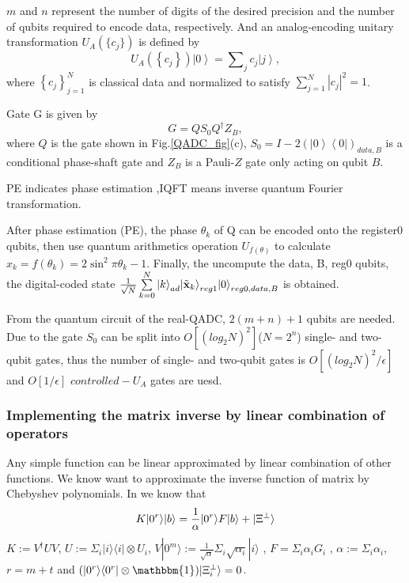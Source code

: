 \documentclass[%
 reprint,
 amsmath,amssymb,
pra,
]{revtex4-1}
\begin{document}
$m$ and $n$ represent the number of digits of the desired precision and the number of qubits required to encode data, respectively.
And an analog-encoding unitary transformation $U_A(\{c_j\})$ is defined by
\begin{equation}
U_A\left( {\left\{ {{c_j}} \right\}} \right)\left| 0 \right\rangle  = \sum\nolimits_j {{c_j}\left| j \right\rangle },
\end{equation}
where $\left\{ {{c_j}} \right\}_{j = 1}^N$ is classical data and normalized to satisfy $\sum\nolimits_{j = 1}^N {{{\left| {{c_j}} \right|}^2}}  = 1$.

Gate G is given by
\begin{equation}
G = Q{S_0}{Q^\dag }{Z_B},
\end{equation}
where $Q$ is the gate shown in Fig.\ref{QADC_fig}(c), ${S_0} = I - 2{\left( {\left| 0 \right\rangle \left\langle 0 \right|} \right)_{data,B}}$
is a conditional phase-shaft gate and ${Z_B}$ is a Pauli-$Z$ gate only acting on qubit $B$.

PE indicates phase estimation ,IQFT means inverse quantum Fourier transformation\cite{nielsen_quantum_2002}.

After phase estimation (PE), the phase ${\theta _k}$ of Q can be encoded onto the register0 qubits, then use quantum arithmetics operation ${U_{f\left( \theta  \right)}}$ to calculate
${x_k} = f\left( {{\theta _k}} \right) = 2{\sin ^2}\pi {\theta _k} - 1$.
Finally, the uncompute the data, B, reg0 qubits, the digital-coded state
$\frac{1}{{\sqrt N }}\sum\limits_{k = 0}^N {{{\left| k \right\rangle }_{ad}}{{\left| {{{\tilde {\textbf x}}_k}} \right\rangle }_{reg1}}{{\left| 0 \right\rangle }_{reg0,data,B}}} $
is obtained.


From the quantum circuit of the real-QADC, $2(m+n)+1$ qubits are needed. Due to the gate $S_0$ can be split into $O[(log_{2}N)^2]$($N=2^n$) 
single- and two-qubit gates\cite{barenco_elementary_1995}, thus the number of single- and two-qubit gates is $O[(log_{2}N)^2/{\epsilon}]$ and $O[1/{\epsilon}]$ $controlled-U_A$ gates are uesd\cite{mitarai2019quantum}.


\subsubsection{Implementing the matrix inverse by linear combination of operators}
Any simple function can be linear approximated by linear combination of other
functions. We know want to approximate the inverse function of matrix by
Chebyshev polynomials. In \cite{Childs2017Quantum} we know that 
\begin{equation}
\label{K}
K|0^r\rangle|b\rangle=\frac{1}{\alpha}|0^r\rangle F|b\rangle
+|\Xi^\bot \rangle\notag
\end{equation}
$K:=V^\dagger UV$, $U:=\Sigma_i|i\rangle\langle i|
\otimes U_i$, 
$V|0^m\rangle:=\frac{1}{\sqrt{\alpha}}\Sigma_i\sqrt{\alpha_i}|i\rangle$
, $F=\Sigma_i\alpha_iG_i$
, $\alpha:=\Sigma_i\alpha_i$, $r=m+t$ and 
$(|0^r\rangle\langle0^r|\otimes\mathbbm{1})|\Xi_i^\bot\rangle=0$.
\end{document}
